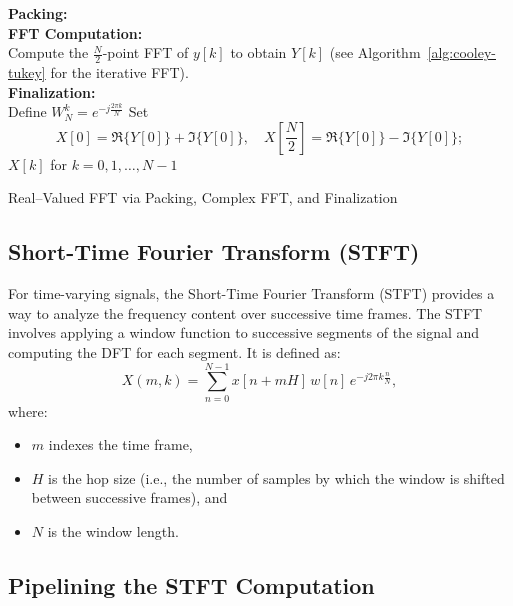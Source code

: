 \documentclass[12pt,letter]{article}
\begin{document}
\begin{algorithm}[H]
\SetAlgoLined
{}
\textbf{Packing:}\\
\textbf{FFT Computation:}\\
Compute the \( \frac{N}{2} \)-point FFT of \( y[k] \) to obtain \( Y[k] \) \;
(see Algorithm~\ref{alg:cooley-tukey} for the iterative FFT).\\
\textbf{Finalization:}\\
Define \( W_N^k = e^{-j\frac{2\pi k}{N}} \) \;
Set
\[
X[0] = \Re\{Y[0]\} + \Im\{Y[0]\}, \quad X\left[\frac{N}{2}\right] = \Re\{Y[0]\} - \Im\{Y[0]\};
\]
\Return \( X[k] \) for \( k = 0,1,\dots,N-1 \)\;
\caption{Real--Valued FFT via Packing, Complex FFT, and Finalization}
\label{alg:rfft}
\end{algorithm}

\subsection{Short-Time Fourier Transform (STFT)}

For time-varying signals, the Short-Time Fourier Transform (STFT) provides a
way to analyze the frequency content over successive time frames. The STFT
involves applying a window function to successive segments of the signal and
computing the DFT for each segment. It is defined as:
\begin{equation}
X(m, k) = \sum_{n=0}^{N-1} x[n + mH] \, w[n] \, e^{-j2\pi k \frac{n}{N}},
\label{eqn:stft}
\end{equation}
where:
\begin{itemize}
  \item $m$ indexes the time frame,
  \item $H$ is the hop size (i.e., the number of samples by which the window
  is shifted between successive frames), and
  \item $N$ is the window length.
\end{itemize}

\subsection{Pipelining the STFT Computation}
\end{document}
